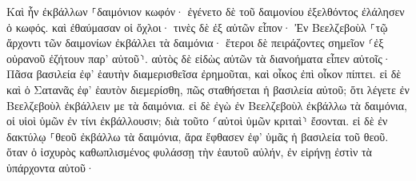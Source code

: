 \documentclass{openreader}
\begin{document}
Καὶ ἦν ἐκβάλλων ⸀δαιμόνιον κωφόν· ἐγένετο δὲ τοῦ δαιμονίου ἐξελθόντος ἐλάλησεν ὁ κωφός. καὶ ἐθαύμασαν οἱ ὄχλοι· 
τινὲς δὲ ἐξ αὐτῶν εἶπον· Ἐν Βεελζεβοὺλ ⸀τῷ ἄρχοντι τῶν δαιμονίων ἐκβάλλει τὰ δαιμόνια· 
ἕτεροι δὲ πειράζοντες σημεῖον ⸂ἐξ οὐρανοῦ ἐζήτουν παρ’ αὐτοῦ⸃. 
αὐτὸς δὲ εἰδὼς αὐτῶν τὰ διανοήματα εἶπεν αὐτοῖς· Πᾶσα βασιλεία ἐφ’ ἑαυτὴν διαμερισθεῖσα ἐρημοῦται, καὶ οἶκος ἐπὶ οἶκον πίπτει. 
εἰ δὲ καὶ ὁ Σατανᾶς ἐφ’ ἑαυτὸν διεμερίσθη, πῶς σταθήσεται ἡ βασιλεία αὐτοῦ; ὅτι λέγετε ἐν Βεελζεβοὺλ ἐκβάλλειν με τὰ δαιμόνια. 
εἰ δὲ ἐγὼ ἐν Βεελζεβοὺλ ἐκβάλλω τὰ δαιμόνια, οἱ υἱοὶ ὑμῶν ἐν τίνι ἐκβάλλουσιν; διὰ τοῦτο ⸂αὐτοὶ ὑμῶν κριταὶ⸃ ἔσονται. 
εἰ δὲ ἐν δακτύλῳ ⸀θεοῦ ἐκβάλλω τὰ δαιμόνια, ἄρα ἔφθασεν ἐφ’ ὑμᾶς ἡ βασιλεία τοῦ θεοῦ. 
ὅταν ὁ ἰσχυρὸς καθωπλισμένος φυλάσσῃ τὴν ἑαυτοῦ αὐλήν, ἐν εἰρήνῃ ἐστὶν τὰ ὑπάρχοντα αὐτοῦ· 
\end{document}
